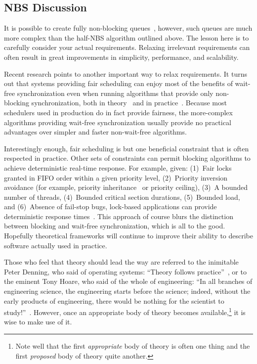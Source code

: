 \fi

\subsection{NBS Discussion}
\label{sec:advsync:NBS Discussion}

It is possible to create fully non-blocking queues~\cite{MichaelScott96},
however, such queues are much more complex than the half-NBS algorithm
outlined above.
The lesson here is to carefully consider your actual requirements.
Relaxing irrelevant requirements can often result in great
improvements in simplicity, performance, and scalability.

Recent research points to another important way to relax requirements.
It turns out that systems providing fair scheduling can enjoy most
of the benefits of wait-free synchronization even when running
algorithms that provide only non-blocking
synchronization, both in theory~\cite{DanAlitarh2013PracticalProgress}
and in practice~\cite{SamyAlBahra2013NBS}.
Because most schedulers used in production do in fact provide fairness,
the more-complex algorithms providing wait-free synchronization usually
provide no practical advantages over simpler and faster non-wait-free
algorithms.

Interestingly enough, fair scheduling is but one beneficial
constraint that is often respected in practice.
Other sets of constraints can permit blocking algorithms to
achieve deterministic real-time response.
For example, given:
(1)~Fair locks granted in FIFO order within a given priority level,
(2)~Priority inversion avoidance (for example, priority
inheritance~\cite{Takada:1995:RSN:527074.828566,Cai-DongWang1996PrioInherLock}
or priority ceiling),
(3)~A bounded number of threads,
(4)~Bounded critical section durations,
(5)~Bounded load,
and
(6)~Absence of fail-stop bugs,
lock-based applications can provide deterministic
response times~\cite{BjoernBrandenburgPhD,DipankarSarma2004OLSscalability}.
This approach of course blurs the distinction between blocking and wait-free
synchronization, which is all to the good.
Hopefully theoretical frameworks will continue to improve their ability
to describe software actually used in practice.

Those who feel that theory should lead the way are referred to the
inimitable Peter Denning, who said of operating systems:
``Theory follows practice''~\cite{Denning:2015:POF:2830903.2830904},
or to the eminent Tony Hoare, who said of the whole of engineering:
``In all branches of engineering science, the engineering starts before
the science; indeed, without the early products of engineering, there
would be nothing for the scientist to
study!''~\cite{RichardMorris2007TonyHoareInterview}.
However, once an appropriate body of theory becomes available,\footnote{
	Note well that the first \emph{appropriate} body of theory is often one
	thing and the first \emph{proposed} body of theory quite another.}
it is wise to make use of it.



